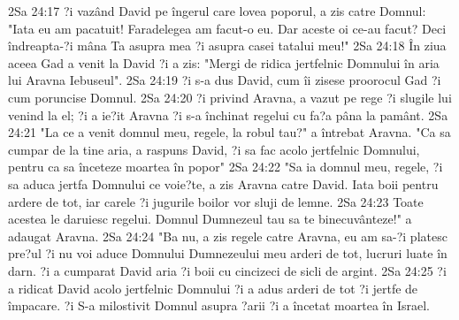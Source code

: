2Sa 24:17  ?i vazând David pe îngerul care lovea poporul, a zis catre Domnul: "Iata eu am pacatuit! Faradelegea am facut-o eu. Dar aceste oi ce-au facut? Deci îndreapta-?i mâna Ta asupra mea ?i asupra casei tatalui meu!"
2Sa 24:18  În ziua aceea Gad a venit la David ?i a zis: "Mergi de ridica jertfelnic Domnului în aria lui Aravna Iebuseul".
2Sa 24:19  ?i s-a dus David, cum îi zisese proorocul Gad ?i cum poruncise Domnul.
2Sa 24:20  ?i privind Aravna, a vazut pe rege ?i slugile lui venind la el; ?i a ie?it Aravna ?i s-a închinat regelui cu fa?a pâna la pamânt.
2Sa 24:21  "La ce a venit domnul meu, regele, la robul tau?" a întrebat Aravna. "Ca sa cumpar de la tine aria, a raspuns David, ?i sa fac acolo jertfelnic Domnului, pentru ca sa înceteze moartea în popor"
2Sa 24:22  "Sa ia domnul meu, regele, ?i sa aduca jertfa Domnului ce voie?te, a zis Aravna catre David. Iata boii pentru ardere de tot, iar carele ?i jugurile boilor vor sluji de lemne.
2Sa 24:23  Toate acestea le daruiesc regelui. Domnul Dumnezeul tau sa te binecuvânteze!" a adaugat Aravna.
2Sa 24:24  "Ba nu, a zis regele catre Aravna, eu am sa-?i platesc pre?ul ?i nu voi aduce Domnului Dumnezeului meu arderi de tot, lucruri luate în darn. ?i a cumparat David aria ?i boii cu cincizeci de sicli de argint.
2Sa 24:25  ?i a ridicat David acolo jertfelnic Domnului ?i a adus arderi de tot ?i jertfe de împacare. ?i S-a milostivit Domnul asupra ?arii ?i a încetat moartea în Israel.


